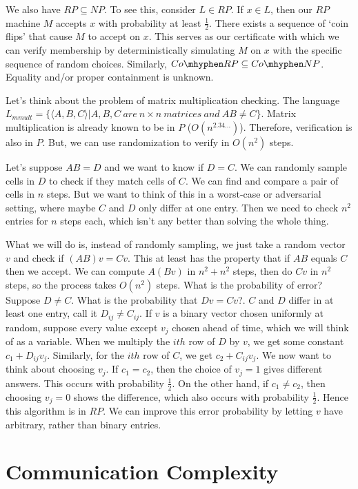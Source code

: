 \documentclass[twoside]{article}
\begin{document}
We also have $RP\subseteq NP$.  To see this, consider $L\in RP$.  If $x\in L$, then our $RP$ machine $M$ accepts $x$ with probability at least $\frac{1}{2}$.  There exists a sequence of `coin flips' that cause $M$ to accept on $x$.  This serves as our certificate with which we can verify membership by deterministically simulating $M$ on $x$ with the specific sequence of random choices.  Similarly, $Co\mhyphen RP \subseteq Co\mhyphen NP$.  Equality and/or proper containment is unknown.

Let's think about the problem of matrix multiplication checking.  The language 
$L_{mmult}=\{\langle A,B,C\rangle | A,B,C \ are \ n\times n \ matrices \ and \ AB\neq C\}$.  Matrix multiplication is already known to be in $P$ ($O(n^{2.34\dots})$).  Therefore, verification is also in $P$.  But, we can use randomization to verify in $O(n^2)$ steps.

Let's suppose $AB=D$ and we want to know if $D=C$.  We can randomly sample cells in $D$ to check if they match cells of $C$.  We can find and compare a pair of cells in $n$ steps.  But we want to think of this in a worst-case or adversarial setting, where maybe $C$ and $D$ only differ at one entry.  Then we need to check $n^2$ entries for $n$ steps each, which isn't any better than solving the whole thing.  

What we will do is, instead of randomly sampling, we just take a random vector $v$ and check if $(AB)v = Cv$.  This at least has the property that if $AB$ equals $C$ then we accept.  We can compute $A(Bv)$ in $n^2 + n^2$ steps, then do $Cv$ in $n^2$ steps, so the process takes $O(n^2)$ steps.  What is the probability of error?  Suppose $D\neq C$. What is the probability that $Dv=Cv$?.  $C$ and $D$ differ in at least one entry, call it $D_{ij}\neq C_{ij}$.  If $v$ is a binary vector chosen uniformly at random, suppose every value except $v_j$ chosen ahead of time, which we will think of as a variable.  When we multiply the $ith$ row of $D$ by $v$, we get some constant $c_1 + D_{ij}v_j$.  Similarly, for the $ith$ row of $C$, we get $c_2 + C_{ij}v_j$.  We now want to think about choosing $v_j$.  If $c_1 = c_2$, then the choice of $v_j=1$ gives different answers.  This occurs with probability $\frac{1}{2}$.  On the other hand, if $c_1\neq c_2$, then choosing $v_j=0$ shows the difference, which also occurs with probability $\frac{1}{2}$.  Hence this algorithm is in $RP$.  We can improve this error probability by letting $v$ have arbitrary, rather than binary entries.


\section*{Communication Complexity}
\end{document}
